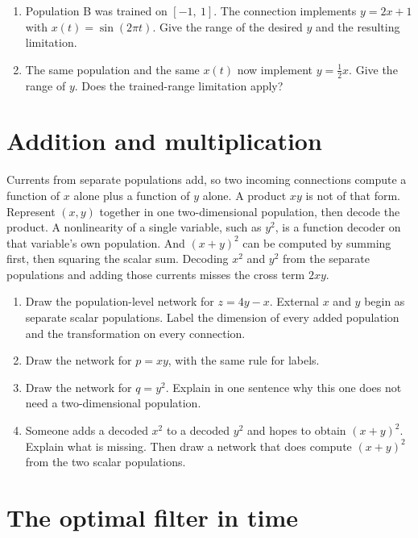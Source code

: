 \documentclass[11pt,letterpaper]{article}
\begin{document}
\begin{enumerate}
\item Population B was trained on $[-1,\ 1]$. The connection implements $y = 2x + 1$ with $x(t) = \sin(2\pi t)$. Give the range of the desired $y$ and the resulting limitation.
\item The same population and the same $x(t)$ now implement $y = \tfrac12 x$. Give the range of $y$. Does the trained-range limitation apply?
\end{enumerate}

\section{Addition and multiplication}

\begin{idea}
Currents from separate populations add, so two incoming connections compute a function of $x$ alone plus a function of $y$ alone. A product $xy$ is not of that form. Represent $(x, y)$ together in one two-dimensional population, then decode the product. A nonlinearity of a single variable, such as $y^2$, is a function decoder on that variable's own population. And $(x+y)^2$ can be computed by summing first, then squaring the scalar sum. Decoding $x^2$ and $y^2$ from the separate populations and adding those currents misses the cross term $2xy$.
\end{idea}

\begin{enumerate}
\item Draw the population-level network for $z = 4y - x$. External $x$ and $y$ begin as separate scalar populations. Label the dimension of every added population and the transformation on every connection.
\item Draw the network for $p = xy$, with the same rule for labels.
\item Draw the network for $q = y^2$. Explain in one sentence why this one does not need a two-dimensional population.
\item Someone adds a decoded $x^2$ to a decoded $y^2$ and hopes to obtain $(x+y)^2$. Explain what is missing. Then draw a network that does compute $(x+y)^2$ from the two scalar populations.
\end{enumerate}

\section{The optimal filter in time}
\end{document}
